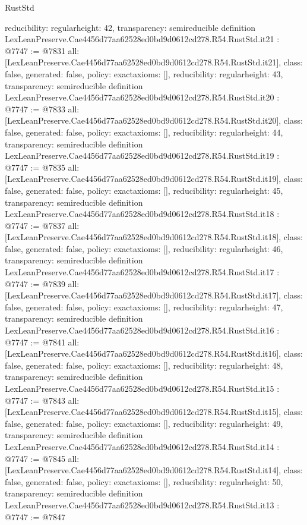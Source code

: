 \begin{lexlean}{RustStd}
\begin{coremodule}
{  reducibility: regular{height: 42},
  transparency: semireducible
}
definition LexLeanPreserve.Cae4456d77aa62528ed0bd9d0612cd278.R54.RustStd.it21 : @7747 := @7831 {
  all: [LexLeanPreserve.Cae4456d77aa62528ed0bd9d0612cd278.R54.RustStd.it21],
  class: false,
  generated: false,
  policy: exact{axioms: []},
  reducibility: regular{height: 43},
  transparency: semireducible
}
definition LexLeanPreserve.Cae4456d77aa62528ed0bd9d0612cd278.R54.RustStd.it20 : @7747 := @7833 {
  all: [LexLeanPreserve.Cae4456d77aa62528ed0bd9d0612cd278.R54.RustStd.it20],
  class: false,
  generated: false,
  policy: exact{axioms: []},
  reducibility: regular{height: 44},
  transparency: semireducible
}
definition LexLeanPreserve.Cae4456d77aa62528ed0bd9d0612cd278.R54.RustStd.it19 : @7747 := @7835 {
  all: [LexLeanPreserve.Cae4456d77aa62528ed0bd9d0612cd278.R54.RustStd.it19],
  class: false,
  generated: false,
  policy: exact{axioms: []},
  reducibility: regular{height: 45},
  transparency: semireducible
}
definition LexLeanPreserve.Cae4456d77aa62528ed0bd9d0612cd278.R54.RustStd.it18 : @7747 := @7837 {
  all: [LexLeanPreserve.Cae4456d77aa62528ed0bd9d0612cd278.R54.RustStd.it18],
  class: false,
  generated: false,
  policy: exact{axioms: []},
  reducibility: regular{height: 46},
  transparency: semireducible
}
definition LexLeanPreserve.Cae4456d77aa62528ed0bd9d0612cd278.R54.RustStd.it17 : @7747 := @7839 {
  all: [LexLeanPreserve.Cae4456d77aa62528ed0bd9d0612cd278.R54.RustStd.it17],
  class: false,
  generated: false,
  policy: exact{axioms: []},
  reducibility: regular{height: 47},
  transparency: semireducible
}
definition LexLeanPreserve.Cae4456d77aa62528ed0bd9d0612cd278.R54.RustStd.it16 : @7747 := @7841 {
  all: [LexLeanPreserve.Cae4456d77aa62528ed0bd9d0612cd278.R54.RustStd.it16],
  class: false,
  generated: false,
  policy: exact{axioms: []},
  reducibility: regular{height: 48},
  transparency: semireducible
}
definition LexLeanPreserve.Cae4456d77aa62528ed0bd9d0612cd278.R54.RustStd.it15 : @7747 := @7843 {
  all: [LexLeanPreserve.Cae4456d77aa62528ed0bd9d0612cd278.R54.RustStd.it15],
  class: false,
  generated: false,
  policy: exact{axioms: []},
  reducibility: regular{height: 49},
  transparency: semireducible
}
definition LexLeanPreserve.Cae4456d77aa62528ed0bd9d0612cd278.R54.RustStd.it14 : @7747 := @7845 {
  all: [LexLeanPreserve.Cae4456d77aa62528ed0bd9d0612cd278.R54.RustStd.it14],
  class: false,
  generated: false,
  policy: exact{axioms: []},
  reducibility: regular{height: 50},
  transparency: semireducible
}
definition LexLeanPreserve.Cae4456d77aa62528ed0bd9d0612cd278.R54.RustStd.it13 : @7747 := @7847 {
}
\end{coremodule}
\end{lexlean}
